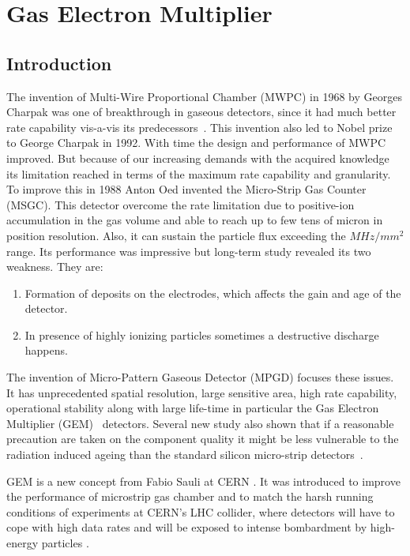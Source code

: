 \chapter{Gas Electron Multiplier} %
\label{cha:gas_electron_multiplier}

\section{Introduction} %
\label{sec:introduction}

The invention of Multi-Wire Proportional Chamber (MWPC) in 1968 by Georges Charpak was one of breakthrough in gaseous detectors, since it had much better rate capability vis-a-vis its predecessors~\cite{Charpak1968}. This invention also led to Nobel prize to George Charpak in 1992. With time the design and performance of MWPC improved. But because of our increasing demands with the acquired knowledge its limitation reached in terms of the maximum rate capability and granularity. To improve this in 1988 Anton Oed invented the Micro-Strip Gas Counter (MSGC). This detector overcome the rate limitation due to positive-ion accumulation in the gas volume and able to reach up to few tens of micron in position resolution. Also, it can sustain the particle flux exceeding the $MHz/mm^2$ range. Its performance was impressive but long-term study revealed its two weakness. They are:
\begin{enumerate}
	\item Formation of deposits on the electrodes, which affects the gain and age of the detector.
	\item In presence of highly ionizing particles sometimes a destructive discharge happens.
\end{enumerate}
The invention of Micro-Pattern Gaseous Detector (MPGD) focuses these issues. It has unprecedented spatial resolution, large sensitive area, high rate capability, operational stability along with large life-time in particular the Gas Electron Multiplier (GEM)~\cite{Sauli1997,Sauli1999} detectors. Several new study also shown that if a reasonable precaution are taken on the component quality it might be less vulnerable to the radiation induced ageing than the standard silicon micro-strip detectors~\cite{TITOV2004,Titov2002}.

GEM is a new concept from Fabio Sauli at CERN \cite{Sauli1997}. It was introduced to improve the performance of microstrip gas chamber and to match the harsh running conditions of experiments at CERN's LHC collider, where detectors will have to cope with high data rates and will be exposed to intense bombardment by high-energy particles \cite{detector:1732870}.

